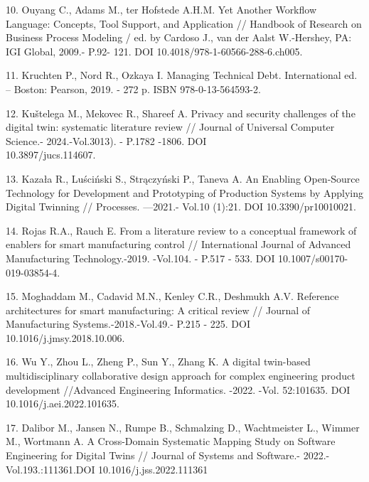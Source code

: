 \begin{refs}
10. Ouyang C., Adams M., ter Hofstede A.H.M. Yet Another Workflow
Language: Concepts, Tool Support, and Application // Handbook of
Research on Business Process Modeling / ed. by Cardoso J., van der Aalst
W.-Hershey, PA: IGI Global, 2009.- P.92- 121. DOI
10.4018/978-1-60566-288-6.ch005.

11. Kruchten P., Nord R., Ozkaya I. Managing Technical Debt.
International ed. -- Boston: Pearson, 2019. - 272 p. ISBN
978-0-13-564593-2.

12. Kuštelega M., Mekovec R., Shareef A. Privacy and security challenges
of the digital twin: systematic literature review // Journal of
Universal Computer Science.- 2024.-Vol.3013). - P.1782 -1806. DOI\\
10.3897/jucs.114607.

13. Kazała R., Luściński S., Strączyński P., Taneva A. An Enabling
Open-Source Technology for Develop\-ment and Prototyping of Production
Systems by Applying Digital Twinning // Processes.
---2021.- Vol.10 (1):21. DOI 10.3390/pr10010021.

14. Rojas R.A., Rauch E. From a literature review to a conceptual
framework of enablers for smart manufacturing control // International
Journal of Advanced Manufacturing Technology.-2019. -Vol.104. - P.517
- 533. DOI 10.1007/s00170-019-03854-4.

15. Moghaddam M., Cadavid M.N., Kenley C.R., Deshmukh A.V. Reference
architectures for smart manufacturing: A critical review // Journal of
Manufacturing Systems.-2018.-Vol.49.- P.215 - 225. DOI
10.1016/j.jmsy.2018.10.006.

16. Wu Y., Zhou L., Zheng P., Sun Y., Zhang K. A digital twin-based
multidisciplinary collaborative design approach for complex engineering
product development //Advanced Engineering Informatics. -2022. -Vol.
52:101635. DOI 10.1016/j.aei.2022.101635.


17. Dalibor M., Jansen N., Rumpe B., Schmalzing D., Wachtmeister L.,
Wimmer M., Wortmann A. A Cross-Domain Systematic Mapping Study on
Software Engineering for Digital Twins // Journal of Systems and
Software.- 2022.-Vol.193.:111361.DOI 10.1016/j.jss.2022.111361
\end{refs}

